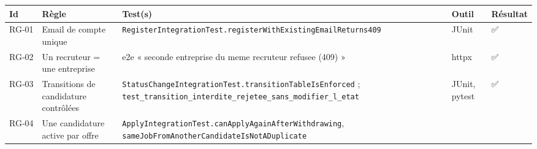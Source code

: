 \documentclass[
  11pt,
]{article}
\begin{document}
\begin{longtable}[]{@{}
  >{\raggedright\arraybackslash}p{}
  >{\raggedright\arraybackslash}p{}
  >{\raggedright\arraybackslash}p{}
  >{\raggedright\arraybackslash}p{}
  >{\raggedright\arraybackslash}p{}@{}}
\toprule\noalign{}
\begin{minipage}[b]{\linewidth}\raggedright
Id
\end{minipage} & \begin{minipage}[b]{\linewidth}\raggedright
Règle
\end{minipage} & \begin{minipage}[b]{\linewidth}\raggedright
Test(s)
\end{minipage} & \begin{minipage}[b]{\linewidth}\raggedright
Outil
\end{minipage} & \begin{minipage}[b]{\linewidth}\raggedright
Résultat
\end{minipage} \\
\midrule\noalign{}
\endhead
\bottomrule\noalign{}
\endlastfoot
RG‑01 & Email de compte unique &
\texttt{Register}\allowbreak{}\texttt{Integration}\allowbreak{}\texttt{Test.}\allowbreak{}\texttt{register}\allowbreak{}\texttt{With}\allowbreak{}\texttt{Existing}\allowbreak{}\texttt{Email}\allowbreak{}\texttt{Returns409}
& JUnit & ✅ \\
RG‑02 & Un recruteur = une entreprise & e2e « seconde entreprise du meme
recruteur refusee (409) » & httpx & ✅ \\
RG‑03 & Transitions de candidature contrôlées &
\texttt{Status}\allowbreak{}\texttt{Change}\allowbreak{}\texttt{Integration}\allowbreak{}\texttt{Test.}\allowbreak{}\texttt{transition}\allowbreak{}\texttt{Table}\allowbreak{}\texttt{Is}\allowbreak{}\texttt{Enforced}
;
\texttt{test\_}\allowbreak{}\texttt{transition\_}\allowbreak{}\texttt{interdite\_}\allowbreak{}\texttt{rejetee\_}\allowbreak{}\texttt{sans\_}\allowbreak{}\texttt{modifier\_}\allowbreak{}\texttt{l\_}\allowbreak{}\texttt{etat}
& JUnit, pytest & ✅ \\
RG‑04 & Une candidature active par offre &
\texttt{Apply}\allowbreak{}\texttt{Integration}\allowbreak{}\texttt{Test.}\allowbreak{}\texttt{can}\allowbreak{}\texttt{Apply}\allowbreak{}\texttt{Again}\allowbreak{}\texttt{After}\allowbreak{}\texttt{Withdrawing},
\texttt{same}\allowbreak{}\texttt{Job}\allowbreak{}\texttt{From}\allowbreak{}\texttt{Another}\allowbreak{}\texttt{Candidate}\allowbreak{}\texttt{Is}\allowbreak{}\texttt{Not}\allowbreak{}\texttt{ADuplicate}

\end{longtable}
\end{document}
